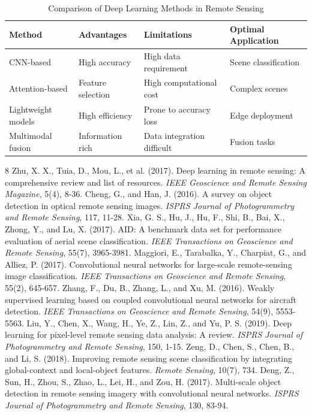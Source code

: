 \documentclass[12pt,a4paper]{article}
\begin{document}
\begin{table}[htbp]
\centering
\caption{Comparison of Deep Learning Methods in Remote Sensing}
\label{tab:comparison}
\begin{tabular}{@{}llll@{}}
\toprule
\textbf{Method} & \textbf{Advantages} & \textbf{Limitations} & \textbf{Optimal Application} \\
\midrule
CNN-based & High accuracy & High data requirement & Scene classification \\
Attention-based & Feature selection & High computational cost & Complex scenes \\
Lightweight models & High efficiency & Prone to accuracy loss & Edge deployment \\
Multimodal fusion & Information rich & Data integration difficult & Fusion tasks \\
\bottomrule
\end{tabular}
\end{table}


\begin{thebibliography}{8}
 Zhu, X. X., Tuia, D., Mou, L., et al. (2017). Deep learning in remote sensing: A comprehensive review and list of resources. \emph{IEEE Geoscience and Remote Sensing Magazine}, 5(4), 8-36.
 Cheng, G., and Han, J. (2016). A survey on object detection in optical remote sensing images. \emph{ISPRS Journal of Photogrammetry and Remote Sensing}, 117, 11-28.
 Xia, G. S., Hu, J., Hu, F., Shi, B., Bai, X., Zhong, Y., and Lu, X. (2017). AID: A benchmark data set for performance evaluation of aerial scene classification. \emph{IEEE Transactions on Geoscience and Remote Sensing}, 55(7), 3965-3981.
 Maggiori, E., Tarabalka, Y., Charpiat, G., and Alliez, P. (2017). Convolutional neural networks for large-scale remote-sensing image classification. \emph{IEEE Transactions on Geoscience and Remote Sensing}, 55(2), 645-657.
 Zhang, F., Du, B., Zhang, L., and Xu, M. (2016). Weakly supervised learning based on coupled convolutional neural networks for aircraft detection. \emph{IEEE Transactions on Geoscience and Remote Sensing}, 54(9), 5553-5563.
 Liu, Y., Chen, X., Wang, H., Ye, Z., Lin, Z., and Yu, P. S. (2019). Deep learning for pixel-level remote sensing data analysis: A review. \emph{ISPRS Journal of Photogrammetry and Remote Sensing}, 150, 1-15.
 Zeng, D., Chen, S., Chen, B., and Li, S. (2018). Improving remote sensing scene classification by integrating global-context and local-object features. \emph{Remote Sensing}, 10(7), 734.
 Deng, Z., Sun, H., Zhou, S., Zhao, L., Lei, H., and Zou, H. (2017). Multi-scale object detection in remote sensing imagery with convolutional neural networks. \emph{ISPRS Journal of Photogrammetry and Remote Sensing}, 130, 83-94.
\end{thebibliography}
\end{document}
